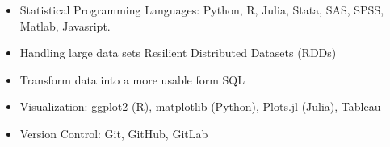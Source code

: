 \documentclass{article}
\begin{document}
\begin{itemize}
  \item Statistical Programming Languages: Python, R, Julia, Stata, SAS,
SPSS, Matlab, Javasript.
  \item Handling large data sets Resilient Distributed Datasets (RDDs)
  \item Transform data into a more usable form SQL
  \item Visualization: ggplot2 (R), matplotlib (Python), Plots.jl (Julia), Tableau
  \item Version Control: Git, GitHub, GitLab

\end{itemize}
\end{document}
